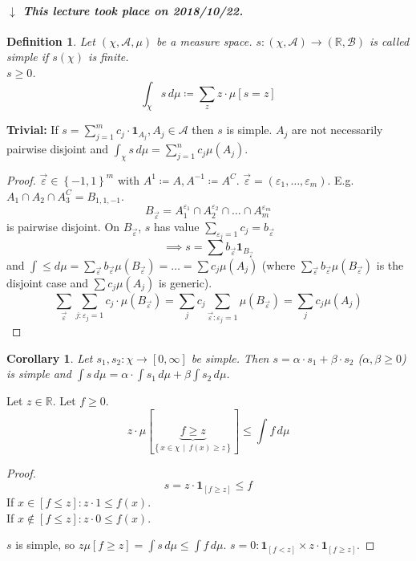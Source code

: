 \documentclass[a4paper]{article}
\newcounter{lecref}[section]
\numberwithin{lecref}{section}
\theoremstyle{break}
\newtheorem{definition}[lecref]{Definition}
\newtheorem{corollary}[lecref]{Corollary}
\newcommand{\dateref}[1]{%
  \begin{mdframed}[backgroundcolor=gray!10,innerbottommargin=0pt,innertopmargin=0pt]
    \paragraph{\textit{$\downarrow$ This lecture took place on #1.}}%
  \end{mdframed}%
}
\newcommand{\Set}[1]{\left\{#1\right\}}
\newcommand{\SetDef}[2]{\left\{#1\,\mid\,#2\right\}}
\def\vec2#1#2{\begin{pmatrix} #1 \\ #2 \end{pmatrix}}
\def\vec3#1#2#3{\begin{pmatrix} #1 \\ #2 \\ #3 \end{pmatrix}}
\begin{document}
\dateref{2018/10/22}

\begin{definition}
  Let $(\chi, \mathcal A, \mu)$ be a measure space.
  $s: (\chi, \mathcal A) \to (\mathbb R, \mathcal B)$ is called \emph{simple}
  if $s(\chi)$ is finite. \\
  $s \geq 0$.
  \[ \int_\chi s \, d\mu \coloneqq \sum_z z \cdot \mu[s = z] \]
\end{definition}

\textbf{Trivial:} If $s = \sum_{j=1}^m c_j \cdot \mathbf 1_{A_j}, A_j \in \mathcal A$
then $s$ is simple. $A_j$ are not necessarily pairwise disjoint
and $\int_\chi s \, d\mu = \sum_{j=1}^n c_j \mu(A_j)$.

\begin{proof}
  $\vec{\varepsilon} \in \Set{-1, 1}^m$ with $A^1 \coloneqq A, A^{-1} \coloneqq A^C$. $\vec{\varepsilon} = (\varepsilon_1, \dots, \varepsilon_m)$. E.g. $A_1 \cap A_2 \cap A_3^C = B_{1,1,-1}$.
  \[ B_{\vec{\varepsilon}} = A_1^{\varepsilon_1} \cap A_2^{\varepsilon_2} \cap \dots \cap A_m^{\varepsilon_m} \]
  is pairwise disjoint. On $B_{\vec{\varepsilon}}$, $s$ has value $\sum_{\varepsilon_j = 1} c_j = b_{\vec{\varepsilon}}$
  \[ \implies s = \sum b_{\vec{\varepsilon}} \mathbf{1}_{B_{\vec{\varepsilon}}} \]
  and $\int \leq d\mu = \sum_{\vec{\varepsilon}} b_{\vec{\varepsilon}} \mu(B_{\vec{\varepsilon}}) = \dots = \sum c_j \mu(A_j)$ (where $\sum_{\vec{\varepsilon}} b_{\vec{\varepsilon}} \mu(B_{\vec{\varepsilon}})$ is the disjoint case and $\sum c_j \mu(A_j)$ is generic).
  \[
    \sum_{\vec{\varepsilon}} \sum_{j: \varepsilon_j = 1} c_j \cdot \mu(B_{\vec{\varepsilon}})
    = \sum_j c_j \sum_{\vec{\varepsilon}: \varepsilon_j = 1} \mu(B_{\vec{\varepsilon}})
    = \sum_j c_j \mu(A_j)
  \]
\end{proof}

\begin{corollary}
  Let $s_1, s_2: \chi \to [0, \infty]$ be simple.
  Then $s = \alpha \cdot s_1 + \beta \cdot s_2$ ($\alpha, \beta \geq 0$) is simple and $\int s \, d\mu = \alpha \cdot \int s_1 \, d\mu + \beta \int s_2 \, d\mu$.
\end{corollary}

\begin{theorem}
  Let $z \in \mathbb R$. Let $f \geq 0$.
  \[ z \cdot \mu [\underbrace{f \geq z}_{\SetDef{x \in \chi}{f(x) \geq z}}] \leq \int f \, d\mu \]
\end{theorem}
\begin{proof}
  \[ s = z \cdot \mathbf{1}_{[f \geq z]} \leq f \]
  If $x \in [f \leq z]: z \cdot 1 \leq f(x)$. \\
  If $x \not\in [f \leq z]: z \cdot 0 \leq f(x)$.

  $s$ is simple, so $z\mu [f \geq z] = \int s \, d\mu \leq \int f \, d\mu$.
  $s = 0: \mathbf{1}_{[f < z]} \times z \cdot \mathbf{1}_{[f \geq z]}$.
\end{proof}
\end{document}
